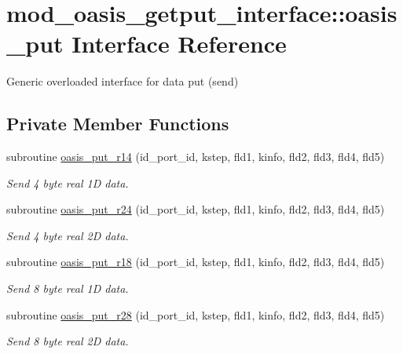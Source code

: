 \hypertarget{interfacemod__oasis__getput__interface_1_1oasis__put}{\section{mod\+\_\+oasis\+\_\+getput\+\_\+interface\+:\+:oasis\+\_\+put Interface Reference}
\label{interfacemod__oasis__getput__interface_1_1oasis__put}
}


Generic overloaded interface for data put (send)  


\subsection*{Private Member Functions}
\begin{DoxyCompactItemize}
\item 
subroutine \hyperlink{interfacemod__oasis__getput__interface_1_1oasis__put_afc4fc88f802a8ba3a0651fa8ea4b6044}{oasis\+\_\+put\+\_\+r14} (id\+\_\+port\+\_\+id, kstep, fld1, kinfo, fld2, fld3, fld4, fld5)
\begin{DoxyCompactList}\small\item\em Send 4 byte real 1\+D data. \end{DoxyCompactList}\item 
subroutine \hyperlink{interfacemod__oasis__getput__interface_1_1oasis__put_ab4506683590789def360b7393b98928f}{oasis\+\_\+put\+\_\+r24} (id\+\_\+port\+\_\+id, kstep, fld1, kinfo, fld2, fld3, fld4, fld5)
\begin{DoxyCompactList}\small\item\em Send 4 byte real 2\+D data. \end{DoxyCompactList}\item 
subroutine \hyperlink{interfacemod__oasis__getput__interface_1_1oasis__put_adc07bb0095b399942dcdde5491039b5a}{oasis\+\_\+put\+\_\+r18} (id\+\_\+port\+\_\+id, kstep, fld1, kinfo, fld2, fld3, fld4, fld5)
\begin{DoxyCompactList}\small\item\em Send 8 byte real 1\+D data. \end{DoxyCompactList}\item 
subroutine \hyperlink{interfacemod__oasis__getput__interface_1_1oasis__put_a47d572f62e2d428ee9088650adeea84b}{oasis\+\_\+put\+\_\+r28} (id\+\_\+port\+\_\+id, kstep, fld1, kinfo, fld2, fld3, fld4, fld5)
\begin{DoxyCompactList}\small\item\em Send 8 byte real 2\+D data. \end{DoxyCompactList}\end{DoxyCompactItemize}



